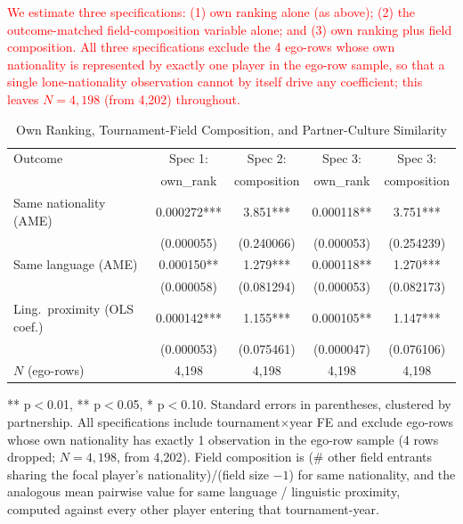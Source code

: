 \documentclass[10pt]{article}
\begin{document}
\textcolor{red}{We estimate three specifications: (1) own ranking alone (as above); (2) the outcome-matched field-composition variable alone; and (3) own ranking plus field composition. All three specifications exclude the 4 ego-rows whose own nationality is represented by exactly one player in the ego-row sample, so that a single lone-nationality observation cannot by itself drive any coefficient; this leaves $N=4{,}198$ (from 4,202) throughout.}


\begin{table}[htbp]
\color{red}
\centering
\caption{Own Ranking, Tournament-Field Composition, and Partner-Culture Similarity \label{tab:t9}}
\begin{threeparttable}
\begin{tabular}{lcccc}
\toprule
Outcome & Spec 1: & Spec 2: & Spec 3: & Spec 3: \\
 & own\_rank & composition & own\_rank & composition \\
\midrule
Same nationality (AME) & 0.000272*** & 3.851*** & 0.000118** & 3.751*** \\
 & (0.000055) & (0.240066) & (0.000053) & (0.254239) \\
Same language (AME) & 0.000150** & 1.279*** & 0.000118** & 1.270*** \\
 & (0.000058) & (0.081294) & (0.000053) & (0.082173) \\
Ling.\ proximity (OLS coef.) & 0.000142*** & 1.155*** & 0.000105** & 1.147*** \\
 & (0.000053) & (0.075461) & (0.000047) & (0.076106) \\
\midrule
$N$ (ego-rows) & 4,198 & 4,198 & 4,198 & 4,198 \\
\bottomrule
\end{tabular}
\begin{tablenotes}
\small
\item *** p$<$0.01, ** p$<$0.05, * p$<$0.10. Standard errors in parentheses, clustered by partnership. All specifications include tournament$\times$year FE and exclude ego-rows whose own nationality has exactly 1 observation in the ego-row sample (4 rows dropped; $N=4{,}198$, from 4,202). Field composition is (\# other field entrants sharing the focal player's nationality)/(field size $-1$) for same nationality, and the analogous mean pairwise value for same language / linguistic proximity, computed against every other player entering that tournament-year.
\end{tablenotes}
\end{threeparttable}
\end{table}
\end{document}
